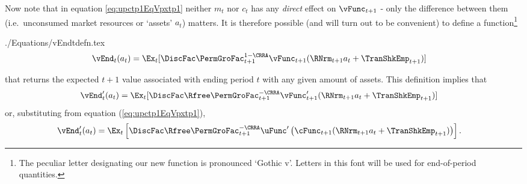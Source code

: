 \documentclass[titlepage, headings=optiontotocandhead]{\econtex}
\begin{document}
Now note that in equation \eqref{eq:upctp1EqVpxtp1} neither ${m}_{t}$ nor
${c}_{t}$ has any \textit{direct} effect on $\null{\vFunc}_{t+1}$ - only the difference between them (i.e.\  unconsumed market resources or `assets' ${a}_t$) matters.  It is therefore possible (and will turn
out to be convenient) to define a function\footnote{The peculiar letter designating our new function is pronounced `Gothic v'.  Letters in this font
  will be used for end-of-period quantities.}
\begin{verbatimwrite}{./Equations/vEndtdefn.tex}
  \begin{equation}\begin{gathered}\begin{aligned}
        {\vEnd}_{t}({a}_{t})  & = \Ex_{t}[\DiscFac \PermGroFac_{t+1}^{1-\CRRA}\null{\vFunc}_{t+1}(\RNrm_{t+1} {a}_{t}+{\TranShkEmp}_{t+1})]  \label{eq:vEndtdefn}
      \end{aligned}\end{gathered}\end{equation}
\end{verbatimwrite}

that returns the expected $t+1$ value associated with ending period
$t$ with any given amount of
 assets.  This definition
implies that
\begin{equation}\begin{gathered}\begin{aligned}
      {\vEnd}_{t}^{\prime}({a}_{t})  & = \Ex_{t}[\DiscFac \Rfree \PermGroFac_{t+1}^{-\CRRA} \null{\vFunc}_{t+1}^{\prime}(\RNrm_{t+1} {a}_{t}+{\TranShkEmp}_{t+1})]  \label{eq:vEndPrimetdefn}
    \end{aligned}\end{gathered}\end{equation}
or, substituting from equation (\ref{eq:upctp1EqVpxtp1}),
\begin{equation}\begin{gathered}\begin{aligned}
      {\vEnd}_{t}^{\prime}({a}_{t})  & = \Ex_{t}\left[\DiscFac \Rfree \PermGroFac_{t+1}^{-\CRRA} \uFunc^{\prime}\left(\cFunc_{t+1}(\RNrm_{t+1} {a}_{t}+{\TranShkEmp}_{t+1})\right)\right].  \label{eq:vEndPrimetOfc}
    \end{aligned}\end{gathered}\end{equation}
\end{document}

